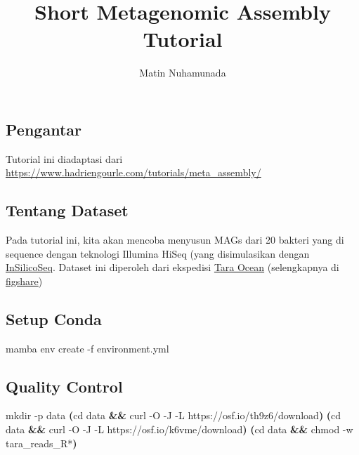 \documentclass[
  letterpaper,
  DIV=11,
  numbers=noendperiod]{scrartcl}
\title{Short Metagenomic Assembly Tutorial}
\author{Matin Nuhamunada}
\date{}
\newenvironment{Shaded}{\begin{snugshade}}{\end{snugshade}}
\newcommand{\AttributeTok}[1]{\textcolor[rgb]{0.40,0.45,0.13}{#1}}
\newcommand{\BuiltInTok}[1]{\textcolor[rgb]{0.00,0.23,0.31}{#1}}
\newcommand{\ExtensionTok}[1]{\textcolor[rgb]{0.00,0.23,0.31}{#1}}
\newcommand{\FunctionTok}[1]{\textcolor[rgb]{0.28,0.35,0.67}{#1}}
\newcommand{\KeywordTok}[1]{\textcolor[rgb]{0.00,0.23,0.31}{\textbf{#1}}}
\newcommand{\NormalTok}[1]{\textcolor[rgb]{0.00,0.23,0.31}{#1}}
\newcommand{\PreprocessorTok}[1]{\textcolor[rgb]{0.68,0.00,0.00}{#1}}
\begin{document}
\maketitle


\subsection{Pengantar}\label{pengantar}

Tutorial ini diadaptasi dari
\url{https://www.hadriengourle.com/tutorials/meta_assembly/}

\subsection{Tentang Dataset}\label{tentang-dataset}

Pada tutorial ini, kita akan mencoba menyusun MAGs dari 20 bakteri yang
di sequence dengan teknologi Illumina HiSeq (yang disimulasikan dengan
\href{http://insilicoseq.readthedocs.io/}{InSilicoSeq}. Dataset ini
diperoleh dari ekspedisi
\href{http://ocean-microbiome.embl.de/companion.html}{Tara Ocean}
(selengkapnya di
\href{https://figshare.com/articles/TARA-NON-REDUNDANT-MAGs/4902923/1}{figshare})

\subsection{Setup Conda}\label{setup-conda}

\begin{Shaded}
\begin{Highlighting}[]
\ExtensionTok{mamba}\NormalTok{ env create }\AttributeTok{{-}f}\NormalTok{ environment.yml}
\end{Highlighting}
\end{Shaded}

\subsection{Quality Control}\label{quality-control}

\begin{Shaded}
\begin{Highlighting}[]
\FunctionTok{mkdir} \AttributeTok{{-}p}\NormalTok{ data}
\KeywordTok{(}\BuiltInTok{cd}\NormalTok{ data }\KeywordTok{\&\&} \ExtensionTok{curl} \AttributeTok{{-}O} \AttributeTok{{-}J} \AttributeTok{{-}L}\NormalTok{ https://osf.io/th9z6/download}\KeywordTok{)}
\KeywordTok{(}\BuiltInTok{cd}\NormalTok{ data }\KeywordTok{\&\&} \ExtensionTok{curl} \AttributeTok{{-}O} \AttributeTok{{-}J} \AttributeTok{{-}L}\NormalTok{ https://osf.io/k6vme/download}\KeywordTok{)}
\KeywordTok{(}\BuiltInTok{cd}\NormalTok{ data }\KeywordTok{\&\&} \FunctionTok{chmod} \AttributeTok{{-}w}\NormalTok{ tara\_reads\_R}\PreprocessorTok{*}\KeywordTok{)}
\end{Highlighting}
\end{Shaded}
\end{document}
